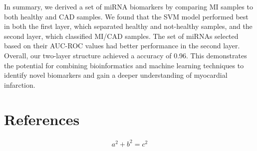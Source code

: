 \documentclass[smallextended]{svjour3}       %
\begin{document}
In summary, we derived a set of miRNA biomarkers by comparing MI samples
to both healthy and CAD samples. We found that the SVM model performed
best in both the first layer, which separated healthy and not-healthy
samples, and the second layer, which classified MI/CAD samples. The set
of miRNAs selected based on their AUC-ROC values had better performance
in the second layer. Overall, our two-layer structure achieved a
accuracy of 0.96. This demonstrates the potential for combining
bioinformatics and machine learning techniques to identify novel
biomarkers and gain a deeper understanding of myocardial infarction.

\hypertarget{references}{%
\section{References}\label{references}}

\begin{align}
a^2+b^2=c^2
\end{align}
\end{document}
